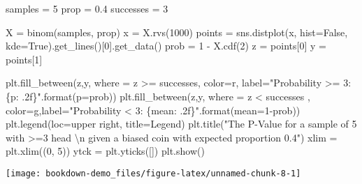 \documentclass[]{tufte-book}
\newenvironment{Shaded}{}{}
\newcommand{\BuiltInTok}[1]{#1}
\newcommand{\CharTok}[1]{\textcolor[rgb]{0.25,0.44,0.63}{#1}}
\newcommand{\DecValTok}[1]{\textcolor[rgb]{0.25,0.63,0.44}{#1}}
\newcommand{\FloatTok}[1]{\textcolor[rgb]{0.25,0.63,0.44}{#1}}
\newcommand{\NormalTok}[1]{#1}
\newcommand{\OperatorTok}[1]{\textcolor[rgb]{0.40,0.40,0.40}{#1}}
\newcommand{\SpecialCharTok}[1]{\textcolor[rgb]{0.25,0.44,0.63}{#1}}
\newcommand{\StringTok}[1]{\textcolor[rgb]{0.25,0.44,0.63}{#1}}
\newcommand{\VariableTok}[1]{\textcolor[rgb]{0.10,0.09,0.49}{#1}}
\theoremstyle{definition}
\theoremstyle{definition}
\theoremstyle{definition}
\theoremstyle{remark}
\begin{document}
\begin{Shaded}
\begin{Highlighting}[]
\NormalTok{samples }\OperatorTok{=} \DecValTok{5}
\NormalTok{prop }\OperatorTok{=} \FloatTok{0.4}
\NormalTok{successes }\OperatorTok{=} \DecValTok{3}

\NormalTok{X }\OperatorTok{=}\NormalTok{ binom(samples, prop)}
\NormalTok{x }\OperatorTok{=}\NormalTok{ X.rvs(}\DecValTok{1000}\NormalTok{)}
\NormalTok{points }\OperatorTok{=}\NormalTok{ sns.distplot(x, hist}\OperatorTok{=}\VariableTok{False}\NormalTok{, kde}\OperatorTok{=}\VariableTok{True}\NormalTok{).get\_lines()[}\DecValTok{0}\NormalTok{].get\_data()}
\NormalTok{prob }\OperatorTok{=} \DecValTok{1} \OperatorTok{{-}}\NormalTok{ X.cdf(}\DecValTok{2}\NormalTok{)}
\NormalTok{z }\OperatorTok{=}\NormalTok{ points[}\DecValTok{0}\NormalTok{]}
\NormalTok{y }\OperatorTok{=}\NormalTok{ points[}\DecValTok{1}\NormalTok{]}

\NormalTok{plt.fill\_between(z,y, where }\OperatorTok{=}\NormalTok{ z }\OperatorTok{\textgreater{}=}\NormalTok{ successes, }
\NormalTok{color}\OperatorTok{=}\StringTok{\textquotesingle{}r\textquotesingle{}}\NormalTok{, label}\OperatorTok{=}\StringTok{"Probability \textgreater{}= 3:}\SpecialCharTok{\{p: .2f\}}\StringTok{"}\NormalTok{.}\BuiltInTok{format}\NormalTok{(p}\OperatorTok{=}\NormalTok{prob))}
\NormalTok{plt.fill\_between(z,y, where }\OperatorTok{=}\NormalTok{ z }\OperatorTok{\textless{}}\NormalTok{ successes , }
\NormalTok{color}\OperatorTok{=}\StringTok{\textquotesingle{}g\textquotesingle{}}\NormalTok{,label}\OperatorTok{=}\StringTok{"Probability \textless{} 3: }\SpecialCharTok{\{mean: .2f\}}\StringTok{"}\NormalTok{.}\BuiltInTok{format}\NormalTok{(mean}\OperatorTok{=}\DecValTok{1}\OperatorTok{{-}}\NormalTok{prob))}
\NormalTok{plt.legend(loc}\OperatorTok{=}\StringTok{\textquotesingle{}upper right\textquotesingle{}}\NormalTok{, title}\OperatorTok{=}\StringTok{\textquotesingle{}Legend\textquotesingle{}}\NormalTok{)}
\NormalTok{plt.title(}\StringTok{"The P{-}Value for a sample of 5 with \textgreater{}=3 head }\CharTok{\textbackslash{}n}\StringTok{ given a biased coin with expected proportion 0.4"}\NormalTok{)}
\NormalTok{xlim }\OperatorTok{=}\NormalTok{ plt.xlim((}\DecValTok{0}\NormalTok{, }\DecValTok{5}\NormalTok{))}
\NormalTok{ytck }\OperatorTok{=}\NormalTok{ plt.yticks([])}
\NormalTok{plt.show()}
\end{Highlighting}
\end{Shaded}

\texttt{[image: bookdown-demo\_files/figure-latex/unnamed-chunk-8-1]}
\end{document}
